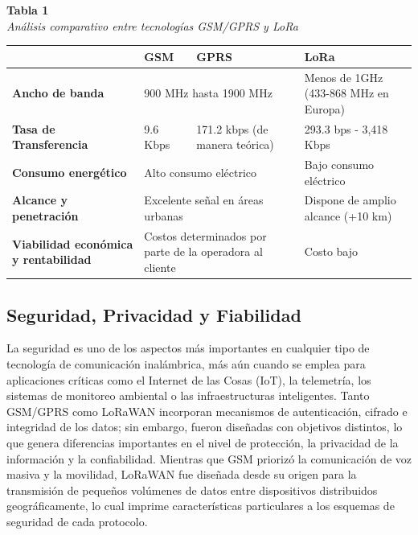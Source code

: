 \documentclass[12pt,a4paper]{article}
\begin{document}
	\begin{table}[H]
		\flushleft
		\textbf{Tabla 1} \\ %
		\textit{Análisis comparativo entre tecnologías GSM/GPRS y LoRa} %
		
		\vspace{0.4cm}
		
		\centering
		\renewcommand{\arraystretch}{1.8}
		\begin{tabular}{| >{\bfseries}p{3.5cm} | p{2.5cm} | p{4cm} | p{4cm} |}
			\hline
			& \textbf{GSM} & \textbf{GPRS} & \textbf{LoRa} \\ \hline
			Ancho de banda & \multicolumn{2}{p{6.5cm}|}{900 MHz hasta 1900 MHz} & Menos de 1GHz \newline (433-868 MHz en Europa) \\ \hline
			Tasa de Transferencia & 9.6 Kbps & 171.2 kbps (de manera teórica) & 293.3 bps - 3,418 Kbps \\ \hline
			Consumo energético & \multicolumn{2}{p{6.5cm}|}{Alto consumo eléctrico} & Bajo consumo eléctrico \\ \hline
			Alcance y penetración & \multicolumn{2}{p{6.5cm}|}{Excelente señal en áreas urbanas} & Dispone de amplio alcance (+10 km) \\ \hline
			Viabilidad económica y rentabilidad & \multicolumn{2}{p{6.5cm}|}{Costos determinados por parte de la operadora al cliente} & Costo bajo \\ \hline
		\end{tabular}
		
		\vspace{0.4cm}
		
		\flushleft
		\small %
	\end{table}
	
	\subsection{Seguridad, Privacidad y Fiabilidad}
	
	La seguridad es uno de los aspectos más importantes en cualquier tipo de tecnología de comunicación inalámbrica, más aún cuando se emplea para aplicaciones críticas como el Internet de las Cosas (IoT), la telemetría, los sistemas de monitoreo ambiental o las infraestructuras inteligentes. Tanto GSM/GPRS como LoRaWAN incorporan mecanismos de autenticación, cifrado e integridad de los datos; sin embargo, fueron diseñadas con objetivos distintos, lo que genera diferencias importantes en el nivel de protección, la privacidad de la información y la confiabilidad. Mientras que GSM priorizó la comunicación de voz masiva y la movilidad, LoRaWAN fue diseñada desde su origen para la transmisión de pequeños volúmenes de datos entre dispositivos distribuidos geográficamente, lo cual imprime características particulares a los esquemas de seguridad de cada protocolo.
	
\end{document}
